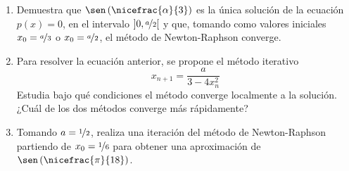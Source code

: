 \begin{ejercicio}
\begin{enumerate}
        \item Demuestra que $\sen\left(\nicefrac{\alpha}{3}\right)$ es la única solución de la ecuación $p(x) = 0$, en el intervalo $\left]0,\nicefrac{a}{2}\right[$ y que, tomando como valores iniciales $x_0 = \nicefrac{a}{3}$ o $x_0 = \nicefrac{a}{2}$, el método de Newton-Raphson converge.
        \item Para resolver la ecuación anterior, se propone el método iterativo
        \[
            x_{n+1} = \frac{a}{3- 4x_n^2}
        \]
        Estudia bajo qué condiciones el método converge localmente a la solución. ¿Cuál de los dos métodos converge más rápidamente?
        \item Tomando $a = \nicefrac{1}{2}$, realiza una iteración del método de Newton-Raphson partiendo de $x_0 = \nicefrac{1}{6}$ para obtener una aproximación de $\sen\left(\nicefrac{\pi}{18}\right)$.
    \end{enumerate}
\end{ejercicio}


